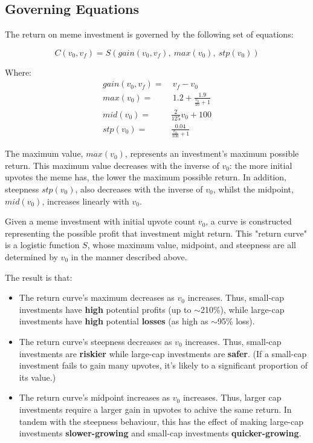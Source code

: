 \documentclass[a4paper, 12pt]{article}
\begin{document}
\subsection*{Governing Equations}
\label{sec:org170ee05}

The return on meme investment is governed by the following set of equations:

\begin{equation*}
C(v_0, v_f) = S(gain(v_0, v_f),\ max(v_0),\ stp(v_0))
\end{equation*}

Where:
\begin{align*}
gain(v_0, v_f) =& \ v_f - v_0\\
max(v_0) =& \ 1.2 + \frac{1.9}{\frac{v_0}{10}+1}\\
mid(v_0) =& \frac{2}{125}v_0 + 100 \\
stp(v_0) =& \frac{0.04}{\frac{v_0}{100} + 1}  
\end{align*}

The maximum value, \(max(v_0)\), represents an investment's maximum possible return. This maximum 
value decreases with the inverse of \(v_0\): the more initial upvotes the meme has, the lower 
the maximum possible return. In addition, steepness \(stp(v_0)\), also decreases with the inverse of \(v_0\), 
whilst the midpoint, \(mid(v_0)\), increases linearly with \(v_0\). 

Given a meme investment with initial upvote count \(v_0\), a curve is constructed representing
the possible profit that investment might return. This "return curve" is a logistic function
\(S\), whose maximum value, midpoint, and steepness are all determined by \(v_0\) in
the manner described above. 

The result is that:

\begin{itemize}
\item The return curve's maximum decreases as \(v_0\) increases. Thus, small-cap
investments have \textbf{high} potential profits (up to \(\sim\)210\%), while large-cap
investments have \textbf{high} potential \textbf{losses} (as high as \(\sim\)95\% loss).

\item The return curve's steepness decreases as \(v_0\) increases. Thus, small-cap
investments are \textbf{riskier} while large-cap investments are \textbf{safer}. (If a
small-cap investment fails to gain many upvotes, it's likely to a significant
proportion of its value.)

\item The return curve's midpoint increases as \(v_0\) increases. Thus, larger cap
investments require a larger gain in upvotes to achive the same return. In
tandem with the steepness behaviour, this has the effect of making large-cap
investments \textbf{slower-growing} and small-cap investments \textbf{quicker-growing}.
\end{itemize}
\end{document}
